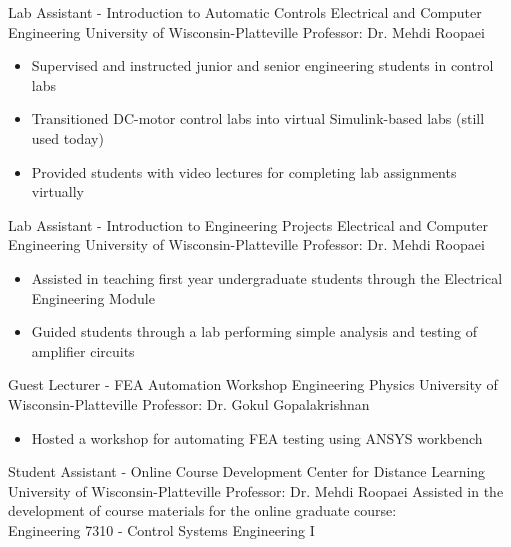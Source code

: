\documentclass[11pt,letterpaper,roman]{moderncv} %
\begin{document}

{Lab Assistant - Introduction to Automatic Controls}
{Electrical and Computer Engineering}
{University of Wisconsin-Platteville}
{Professor: Dr. Mehdi Roopaei}
{\begin{itemize}
    \item Supervised and instructed junior and senior engineering students in control labs
    \item Transitioned DC-motor control labs into virtual Simulink-based labs (still used today)
    \item Provided students with video lectures for completing lab assignments virtually
\end{itemize}
}

{Lab Assistant - Introduction to Engineering Projects}
{Electrical and Computer Engineering}
{University of Wisconsin-Platteville}
{Professor: Dr. Mehdi Roopaei}
{\begin{itemize}
    \item Assisted in teaching first year undergraduate students through the Electrical Engineering Module
    \item Guided students through a lab performing simple analysis and testing of amplifier circuits
\end{itemize}
}

{Guest Lecturer - FEA Automation Workshop}
{Engineering Physics}
{University of Wisconsin-Platteville}
{Professor: Dr. Gokul Gopalakrishnan}
{\begin{itemize}
    \item Hosted a workshop for automating FEA testing using ANSYS workbench
\end{itemize}
}

{Student Assistant - Online Course Development}
{Center for Distance Learning}
{University of Wisconsin-Platteville}
{Professor: Dr. Mehdi Roopaei}
{
    Assisted in the development of course materials for the online graduate course:\\ 
    Engineering 7310 - Control Systems Engineering I
}
\end{document}
